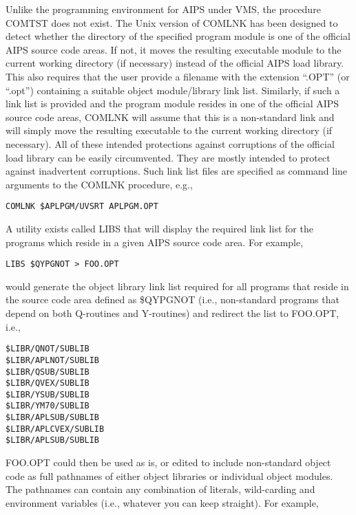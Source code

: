 Unlike the programming environment for AIPS under VMS, the procedure
COMTST does not exist.  The Unix version of COMLNK has been designed
to detect whether the directory of the specified program module is one
of the official AIPS source code areas.  If not, it moves the
resulting executable module to the current working directory (if
necessary) instead of the official AIPS load library.  This also
requires that the user provide a filename with the extension ``.OPT''
(or ``.opt'') containing a suitable object module/library link list.
Similarly, if such a link list is provided and the program module
resides in one of the official AIPS source code areas, COMLNK will
assume that this is a non-standard link and will simply move the
resulting executable to the current working directory (if necessary).
All of these intended protections against corruptions of the official
load library can be easily circumvented.  They are mostly intended to
protect against inadvertent corruptions.  Such link list files are
specified as command line arguments to the COMLNK procedure, e.g.,

\begin{verbatim}
COMLNK $APLPGM/UVSRT APLPGM.OPT

\end{verbatim}
A utility exists called LIBS that will display the required link list
for the programs which reside in a given AIPS source code area.  For
example,

\begin{verbatim}
LIBS $QYPGNOT > FOO.OPT

\end{verbatim}
would generate the object library link list required for all programs
that reside in the source code area defined as \$QYPGNOT (i.e.,
non-standard programs that depend on both Q-routines and Y-routines)
and redirect the list to FOO.OPT, i.e.,

\begin{verbatim}
$LIBR/QNOT/SUBLIB
$LIBR/APLNOT/SUBLIB
$LIBR/QSUB/SUBLIB
$LIBR/QVEX/SUBLIB
$LIBR/YSUB/SUBLIB
$LIBR/YM70/SUBLIB
$LIBR/APLSUB/SUBLIB
$LIBR/APLCVEX/SUBLIB
$LIBR/APLSUB/SUBLIB

\end{verbatim}
FOO.OPT could then be used as is, or edited to include non-standard
object code as full pathnames of either object libraries or individual
object modules.  The pathnames can contain any combination of
literals, wild-carding and environment variables (i.e., whatever you
can keep straight).  For example,

